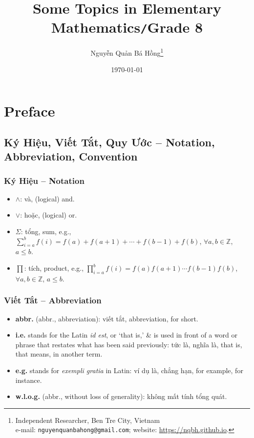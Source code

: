 \documentclass[oneside]{book}
\title{Some Topics in Elementary Mathematics\texttt{/}Grade 8}
\author{Nguyễn Quản Bá Hồng\footnote{Independent Researcher, Ben Tre City, Vietnam\\e-mail: \texttt{nguyenquanbahong@gmail.com}; website: \url{https://nqbh.github.io}.}}
\date{\today}
\numberwithin{equation}{section}
\begin{document}
\frontmatter
\maketitle
\setcounter{secnumdepth}{4}
\setcounter{tocdepth}{3}
\tableofcontents
\newpage


\chapter*{Preface}

\section*{Ký Hiệu, Viết Tắt, Quy Ước -- Notation, Abbreviation, Convention}

\subsection*{Ký Hiệu -- Notation}
\begin{itemize}
	\item $\land$: và, (logical) and.
	\item $\lor$: hoặc, (logical) or.
	\item $\Sigma$: tổng, sum, e.g., $\sum_{i=a}^b f(i) = f(a) + f(a + 1) + \cdots + f(b - 1) + f(b)$, $\forall a,b\in\mathbb{Z}$, $a\le b$.
	\item $\prod$: tích, product, e.g., $\prod_{i=a}^b f(i) = f(a)f(a + 1)\cdots f(b - 1)f(b)$, $\forall a,b\in\mathbb{Z}$, $a\le b$.
\end{itemize}

\subsection*{Viết Tắt -- Abbreviation}
\begin{itemize}
	\item \textbf{abbr.} (abbr., abbreviation): viết tắt, abbreviation, for short.
	\item \textbf{i.e.} stands for the Latin \textit{id est}, or `that is,' \& is used in front of a word or phrase that restates what has been said previously: tức là, nghĩa là, that is, that means, in another term.
	\item \textbf{e.g.} stands for \textit{exempli gratia} in Latin: ví dụ là, chẳng hạn, for example, for instance.
	\item \textbf{w.l.o.g.} (abbr., without loss of generality): không mất tính tổng quát.
\end{itemize}
\end{document}
